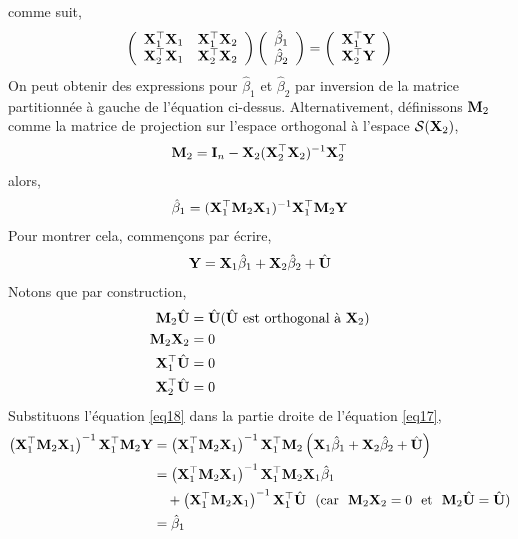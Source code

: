 comme suit,
\begin{align*}
\left(
\begin{array}{cc}
\mathbf X_1^\top\mathbf X_1&\mathbf X_1^\top\mathbf X_2\\
\mathbf X_2^\top\mathbf X_1&\mathbf X_2^\top\mathbf X_2
\end{array}
\right)
\left(
\begin{array}{c}
\hat{\beta}_1\\
\hat{\beta}_2
\end{array}
\right)
=
\left(
\begin{array}{c}
\mathbf X_1^\top\mathbf Y\\
\mathbf X_2^\top\mathbf Y
\end{array}
\right)
\end{align*}
On peut  obtenir des expressions pour $\hat{\beta}_1$ et $\hat{\beta}_2$ par inversion de la matrice partitionnée à gauche de l'équation ci-dessus. Alternativement, définissons $\mathbf M_2$ comme la matrice de projection sur l'espace orthogonal à l'espace $\mathcal{S}(\mathbf X_2)$,
\begin{align*}
\mathbf M_2 = \mathbf{I}_n - \mathbf X_2(\mathbf X_2^\top\mathbf X_2)^{-1}\mathbf X_2^\top
\end{align*}
alors,
\begin{align}
\hat{\beta}_1 = (\mathbf X_1^\top\mathbf M_2 \mathbf X_1)^{-1}\mathbf X_1^\top\mathbf M_2\mathbf Y
\label{eq17}
\end{align}
Pour montrer cela, commençons par écrire,
\begin{align}
\mathbf Y = \mathbf X_1\hat{\beta}_1+\mathbf X_2\hat{\beta}_2 + \hat{\mathbf U}
\label{eq18}
\end{align} 
Notons que par construction,
\begin{align*}
\mathbf M_2\hat{\mathbf U} &= \hat{\mathbf U}(\hat{\mathbf U} \ \textrm{est orthogonal à} \ \mathbf X_2)\\
\mathbf M_2\mathbf X_2 &= 0\\
\mathbf X_1^\top\hat{\mathbf U} &=0\\
\mathbf X_2^\top\hat{\mathbf U} &=0
\end{align*}
Substituons l'équation \eqref{eq18} dans la partie droite de l'équation \eqref{eq17},
\begin{align*}
\left(\mathbf X_1^\top\mathbf M_2\mathbf X_1\right)^{-1}
\mathbf X_1^\top\mathbf M_2\mathbf Y&=\left(\mathbf X_1^\top\mathbf M_2\mathbf X_1\right)^{-1}
\mathbf X_1^\top\mathbf M_2\left(\mathbf X_1\hat{\beta}_1+\mathbf X_2\hat{\beta}_2 + \hat{\mathbf U}\right)\\
&=\left(\mathbf X_1^\top\mathbf M_2\mathbf X_1\right)^{-1}
\mathbf X_1^\top\mathbf M_2\mathbf X_1\hat{\beta}_1\\
 &\ \ \ +
\left(\mathbf X_1^\top\mathbf M_2\mathbf X_1\right)^{-1}
\mathbf X_1^\top\hat{\mathbf U} \ \ (\textrm{car \ }\mathbf M_2\mathbf X_2 = 0 \textrm{ \ et \ } 
 \mathbf M_2\hat{\mathbf U} = \hat{\mathbf U})\\
&=\hat{\beta}_1
\end{align*}
